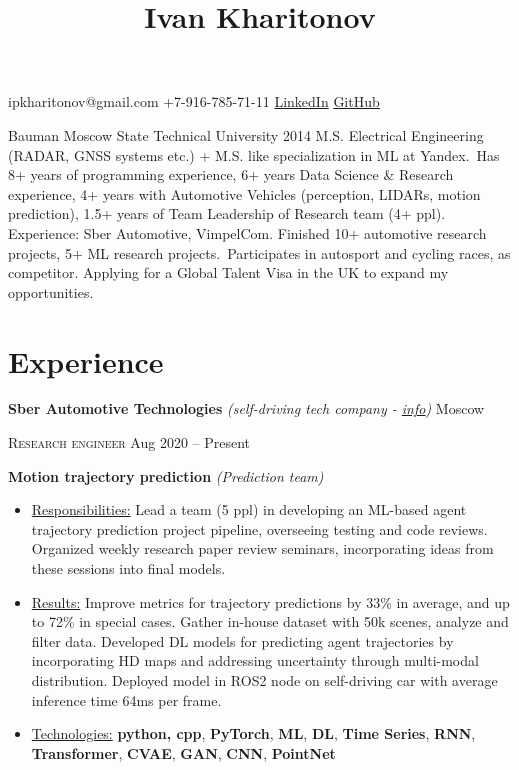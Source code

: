 \documentclass[12pt, a4paper]{extarticle}
\newcommand{\mymk}[1]{\textbf{#1}}
\newcommand{\placeheadding}[3]{\textbf{#1} \textit{#2} \hfill #3\null}
\newcommand{\positionheading}[2]{\par\noindent \textsc{#1} \hfill #2}
\newcommand{\ressubheading}[5]{\placeheadding{#1}{#2}{#3} \positionheading{#4}{#5}}
\newcommand*{\sectionformat}{\centering}
\begin{document}
\setlength{\droptitle}{-10em}
\title{\bfseries\Huge Ivan Kharitonov}
\author{}
\date{}
%  
\maketitle
\vspace{-9.5em}
% 
\par
ipkharitonov@gmail.com
\hfill
+7-916-785-71-11
\hfill
\href{https://www.linkedin.com/in/ivan-kharitonov-main/}{LinkedIn}
\hfill
\href{https://github.com/neer201}{GitHub}
\par
%
Bauman Moscow State Technical University 2014  M.S. Electrical Engineering (RADAR, GNSS systems etc.) + M.S. like specialization in ML at Yandex.\
Has 8+ years of programming experience, 6+ years Data Science \& Research experience, 4+ years with Automotive Vehicles (perception, LIDARs, motion prediction), 1.5+ years of Team Leadership of Research team (4+ ppl). Experience: Sber Automotive, VimpelCom. Finished 10+ automotive research projects, 5+ ML research projects.\
Participates in autosport and cycling races, as competitor. Applying for a Global Talent Visa in the UK to expand my opportunities.
%
\section*{\sectionformat Experience}
% 
\ressubheading{Sber Automotive Technologies}{(self-driving tech company - \href{https://sberautotech.ru/}{info})}{Moscow}{Research engineer}{Aug 2020 -- Present}


\textbf{Motion trajectory prediction} \textit{(Prediction team)}
\begin{itemize}
	\item[] \underline{Responsibilities:} Lead a team (5 ppl) in developing an ML-based agent trajectory prediction project pipeline, overseeing testing and code reviews. Organized weekly research paper review seminars, incorporating ideas from these sessions into final models.
	\item[] \underline{Results:} Improve metrics for trajectory predictions by 33\% in average, and up to 72\% in special cases. Gather in-house dataset with 50k scenes, analyze and filter data. Developed DL models for predicting agent trajectories by incorporating HD maps and addressing uncertainty through multi-modal distribution. Deployed model in ROS2 node on self-driving car with average inference time 64ms per frame.
	\item[] \underline{Technologies:} \mymk{python, cpp}, \mymk{PyTorch}, \mymk{ML}, \mymk{DL}, \mymk{Time Series}, \mymk{RNN}, \mymk{Transformer}, \mymk{CVAE}, \mymk{GAN}, \mymk{CNN}, \mymk{PointNet}
\end{itemize}
\end{document}
